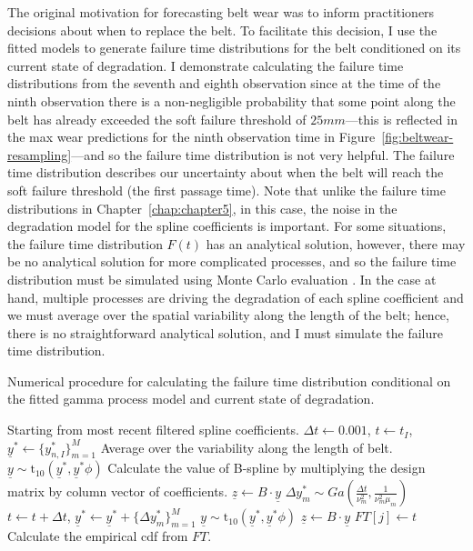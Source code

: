 The original motivation for forecasting belt wear was to inform practitioners decisions about when to replace the belt. To facilitate this decision, I use the fitted models to generate failure time distributions for the belt conditioned on its current state of degradation. I demonstrate calculating the failure time distributions from the seventh and eighth observation since at the time of the ninth observation there is a non-negligible probability that some point along the belt has already exceeded the soft failure threshold of $25mm$---this is reflected in the max wear predictions for the ninth observation time in Figure~\ref{fig:beltwear-resampling}---and so the failure time distribution is not very helpful. The failure time distribution describes our uncertainty about when the belt will reach the soft failure threshold (the first passage time). Note that unlike the failure time distributions in Chapter~\ref{chap:chapter5}, in this case, the noise in the degradation model for the spline coefficients is important. For some situations, the failure time distribution $F(t)$ has an analytical solution, however, there may be no analytical solution for more complicated processes, and so the failure time distribution must be simulated using Monte Carlo evaluation \citep[p.~504-506]{Meeker2022}. In the case at hand, multiple processes are driving the degradation of each spline coefficient and we must average over the spatial variability along the length of the belt; hence, there is no straightforward analytical solution, and I must simulate the failure time distribution.

\begin{algorithm}
	\caption{Numerical procedure for calculating the failure time distribution conditional on the fitted gamma process model and current state of degradation.}
  \label{algo:ftd}
	\begin{algorithmic}[1]
        \State Starting from most recent filtered spline coefficients.
        \State $\Delta t \gets 0.001$, $t \gets t_I$, $\underline{y}^* \gets \{y^*_{n, I}\}^M_{m = 1}$
        \State Average over the variability along the length of belt.
        \State $\underline{y} \sim \mbox{t}_{10}\left(\underline{y}^*, \underline{y}^* \phi\right)$
        \State Calculate the value of B-spline by multiplying the design matrix by column vector of coefficients.
        \State $\underline{z} \gets B \cdot \underline{y}$
          \State $\Delta y^*_m \sim Ga\left(\frac{\Delta t}{\nu_m^2}, \frac{1}{\nu_m^2 \mu_m}\right)$
          \State $t \gets t + \Delta t$, $\underline{y}^* \gets \underline{y}^* + \{\Delta y^*_m\}^M_{m = 1}$
          \State $\underline{y} \sim \mbox{t}_{10}\left(\underline{y}^*, \underline{y}^* \phi\right)$
          \State $\underline{z} \gets B \cdot \underline{y}$
        \EndWhile
        \State $FT[j] \gets t$
      \EndFor
      \State Calculate the empirical cdf from $FT$.
    \EndFor
	\end{algorithmic} 
\end{algorithm} 

